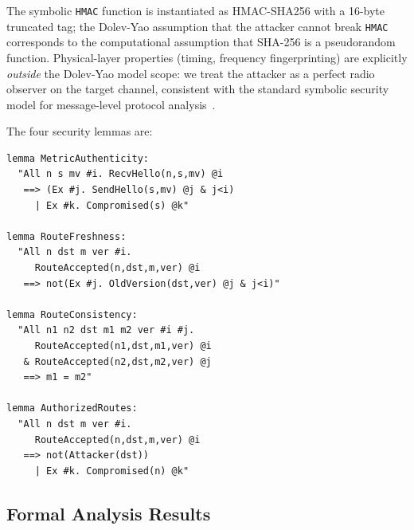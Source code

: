 \documentclass[10pt,journal,compsoc]{IEEEtran}
\begin{document}
\noindent
The symbolic \texttt{HMAC} function is instantiated as HMAC-SHA256 with a
16-byte truncated tag; the Dolev-Yao assumption that the attacker
cannot break \texttt{HMAC} corresponds to the computational assumption that
SHA-256 is a pseudorandom function. Physical-layer properties
(timing, frequency fingerprinting) are explicitly \emph{outside} the
Dolev-Yao model scope: we treat the attacker as a perfect radio
observer on the target channel, consistent with the standard
symbolic security model for message-level protocol analysis~\cite{basin2025-tamarin-book}.

The four security lemmas are:
\begin{lstlisting}[caption={Tamarin lemmas for G1--G4}]
lemma MetricAuthenticity:
  "All n s mv #i. RecvHello(n,s,mv) @i
   ==> (Ex #j. SendHello(s,mv) @j & j<i)
     | Ex #k. Compromised(s) @k"

lemma RouteFreshness:
  "All n dst m ver #i.
     RouteAccepted(n,dst,m,ver) @i
   ==> not(Ex #j. OldVersion(dst,ver) @j & j<i)"

lemma RouteConsistency:
  "All n1 n2 dst m1 m2 ver #i #j.
     RouteAccepted(n1,dst,m1,ver) @i
   & RouteAccepted(n2,dst,m2,ver) @j
   ==> m1 = m2"

lemma AuthorizedRoutes:
  "All n dst m ver #i.
     RouteAccepted(n,dst,m,ver) @i
   ==> not(Attacker(dst))
     | Ex #k. Compromised(n) @k"
\end{lstlisting}

\subsection{Formal Analysis Results}
\end{document}
